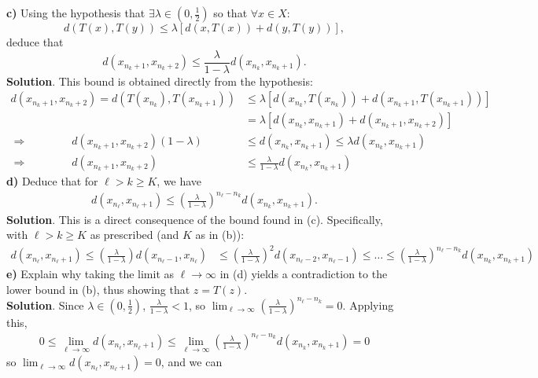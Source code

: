 \documentclass[10pt]{article}
\newcommand{\1}[1]{\mathbbm{1}_{#1}} \newcommand{\mc}[1]{\mathcal{#1}}
\begin{document}
    {\bf c)} Using the hypothesis that $\exists\lambda\in(0,\tfrac{1}{2})$ so
    that $\forall x\in X$:
    \[d(T(x),T(y))\leq \lambda\left[d(x,T(x))+d(y,T(y))\right],\] deduce that
    \[d(x_{n_k+1},x_{n_k+2})\leq\frac{\lambda}{1-\lambda}d(x_{n_k},x_{n_k+1}).\]
    {\bf Solution}. This bound is obtained directly from the hypothesis:
    \begin{align*}
        d(x_{n_k+1},x_{n_k+2})=d(T(x_{n_k}),T(x_{n_k+1}))&\leq\lambda\left[d(x_{n_k},T(x_{n_k}))+d(x_{n_k+1},T(x_{n_k+1}))\right]\\
        &=\lambda\left[d(x_{n_k},x_{n_k+1})+d(x_{n_k+1},x_{n_k+2})\right]\\
        \Rightarrow\qquad\qquad d(x_{n_k+1},x_{n_k+2})(1-\lambda)&\leq d(x_{n_k},x_{n_k+1})\leq \lambda d(x_{n_k},x_{n_k+1})\\
        \Rightarrow\qquad\qquad d(x_{n_k+1},x_{n_k+2})&\leq \frac{\lambda}{1-\lambda}d(x_{n_k},x_{n_k+1})\tag*{$\qed$}
    \end{align*}
    {\bf d)} Deduce that for $\ell>k\geq K$, we have
    \begin{align*}
        d(x_{n_\ell},x_{n_\ell+1})\leq\left(\frac{\lambda}{1-\lambda}\right)^{n_\ell-n_k}d(x_{n_k},x_{n_k+1}).
    \end{align*}
    {\bf Solution}. This is a direct consequence of the bound found in (c).
    Specifically, with $\ell>k\geq K$ as prescribed (and $K$ as in (b)):
    \begin{align*}
        d(x_{n_\ell},x_{n_\ell+1})\leq \left(\frac{\lambda}{1-\lambda}\right)d(x_{n_\ell-1},x_{n_\ell})&\leq \left(\frac{\lambda}{1-\lambda}\right)^2d(x_{n_\ell-2},x_{n_\ell-1})\leq\dots\leq \left(\frac{\lambda}{1-\lambda}\right)^{n_\ell-n_k}d(x_{n_k},x_{n_k+1})\tag{$\qed$}
    \end{align*}
    {\bf e)} Explain why taking the limit as $\ell\rightarrow\infty$ in (d)
    yields a contradiction to the lower bound in (b), thus showing that
    $z=T(z)$.\\[5pt]
    {\bf Solution}. Since $\lambda\in(0,\tfrac{1}{2})$,
    $\tfrac{\lambda}{1-\lambda}<1$, so
    $\lim_{\ell\rightarrow\infty}(\tfrac{\lambda}{1-\lambda})^{n_\ell-n_k}=0$.
    Applying this,
    \begin{align*}
        0\leq\lim_{\ell\rightarrow\infty}d(x_{n_\ell},x_{n_\ell+1})\leq\lim_{\ell\rightarrow\infty}\left(\frac{\lambda}{1-\lambda}\right)^{n_\ell-n_k}d(x_{n_k},x_{n_k+1})=0
    \end{align*}
    so $\lim_{\ell\rightarrow\infty}d(x_{n_\ell},x_{n_\ell+1})=0$, and we can
\end{document}
